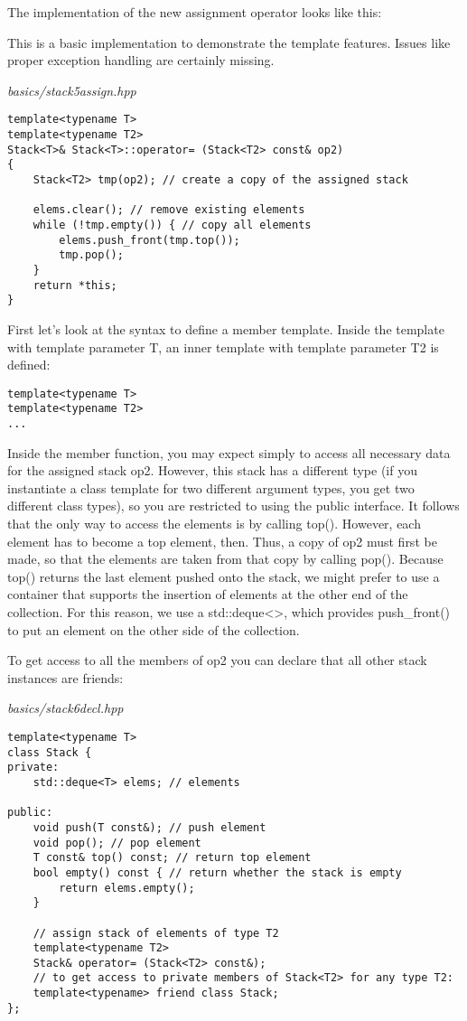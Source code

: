The implementation of the new assignment operator looks like this:

\begin{tcolorbox}[colback=webgreen!5!white,colframe=webgreen!75!black]
\hspace*{0.75cm}This is a basic implementation to demonstrate the template features. Issues like proper exception handling are certainly missing.
\end{tcolorbox}


\noindent
\textit{basics/stack5assign.hpp}
\begin{lstlisting}[style=styleCXX]
template<typename T>
template<typename T2>
Stack<T>& Stack<T>::operator= (Stack<T2> const& op2)
{
	Stack<T2> tmp(op2); // create a copy of the assigned stack
	
	elems.clear(); // remove existing elements
	while (!tmp.empty()) { // copy all elements
		elems.push_front(tmp.top());
		tmp.pop();
	}
	return *this;
}
\end{lstlisting}

First let’s look at the syntax to define a member template. Inside the template with template parameter T, an inner template with template parameter T2 is defined:

\begin{lstlisting}[style=styleCXX]
template<typename T>
template<typename T2>
...
\end{lstlisting}

Inside the member function, you may expect simply to access all necessary data for the assigned stack op2. However, this stack has a different type (if you instantiate a class template for two different argument types, you get two different class types), so you are restricted to using the public interface. It follows that the only way to access the elements is by calling top(). However, each element has to become a top element, then. Thus, a copy of op2 must first be made, so that the elements are taken from that copy by calling pop(). Because top() returns the last element pushed onto the stack, we might prefer to use a container that supports the insertion of elements at the other end of the collection. For this reason, we use a std::deque<>, which provides push\_front() to put an element on the other side of the collection.

To get access to all the members of op2 you can declare that all other stack instances are friends:

\noindent
\textit{basics/stack6decl.hpp}
\begin{lstlisting}[style=styleCXX]
template<typename T>
class Stack {
private:
	std::deque<T> elems; // elements
	
public:
	void push(T const&); // push element
	void pop(); // pop element
	T const& top() const; // return top element
	bool empty() const { // return whether the stack is empty
		return elems.empty();
	}

	// assign stack of elements of type T2
	template<typename T2>
	Stack& operator= (Stack<T2> const&);
	// to get access to private members of Stack<T2> for any type T2:
	template<typename> friend class Stack;
};
\end{lstlisting}

